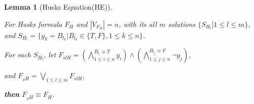 \documentclass[conference,compsocconf]{IEEEtran}
\newtheorem{lemma}{\textbf{Lemma}}
\begin{document}
% 
% 
% 
% 

\begin{lemma}[Husks Equation(HE)]\label{HE}

For Husks formula ${F_H}$ and $|V_{F_H}|= n$,
with its all $m$ solutions $\{S_{H_l}|1\leqslant l\leqslant m\}$,
and $S_{H_l}=\{y_k=B_{l_k}|B_{l_k} \in \{T,F\}, 1\leqslant k\leqslant n\}$.

For each $S_{H_l}$, let $F_{slH}=
(\bigwedge_{1\leqslant i\leqslant n}^{B_{l_i}\equiv T}y_{i})\wedge 
(\bigwedge_{1\leqslant j\leqslant n}^{B_{l_j}\equiv F}\neg y_{j})$,

and $F_{_SH}=\bigvee_{1\leqslant l\leqslant m}F_{slH}$,

\textbf{then}  $F_{_SH} \equiv F_H $.
\end{lemma}
\end{document}
